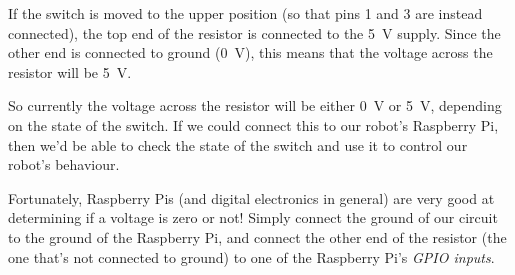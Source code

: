 \documentclass{article}
\begin{document}
If the switch is moved to the upper position (so that pins 1 and 3 are instead
connected), the top end of the resistor is connected to the \SI{5}{\volt}
supply. Since the other end is connected to ground (\SI{0}{\volt}), this means
that the voltage across the resistor will be \SI{5}{\volt}.

So currently the voltage across the resistor will be either \SI{0}{\volt} or
\SI{5}{\volt}, depending on the state of the switch. If we could connect this
to our robot's Raspberry Pi, then we'd be able to check the state of the switch
and use it to control our robot's behaviour.

Fortunately, Raspberry Pis (and digital electronics in general) are very good at
determining if a voltage is zero or not! Simply connect the ground of our
circuit to the ground of the Raspberry Pi, and connect the other end of the
resistor (the one that's not connected to ground) to one of the Raspberry Pi's
\emph{GPIO inputs}. 
\end{document}
